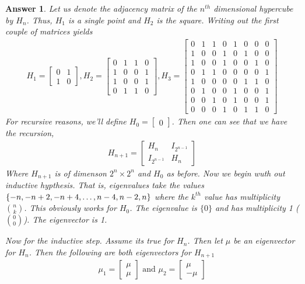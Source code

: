 \documentclass[12pt]{article}
\theoremstyle{colon}
\newtheorem*{answer}{Answer}
\begin{document}
\begin{answer}
  Let us denote the adjacency matrix of the $n^{th}$ dimensional hypercube by $H_n$. Thus, $H_1$ is a single point and $H_2$ is the square. Writing out the first couple of matrices yields
  \begin{gather*}
    H_1 = \begin{bmatrix}
     0 & 1 \\
     1 & 0
    \end{bmatrix}, H_2 = \begin{bmatrix}
     0 & 1 & 1 & 0 \\
     1 & 0 & 0 & 1 \\
     1 & 0 & 0 & 1 \\
     0 & 1 & 1 & 0
    \end{bmatrix}, H_3 = \begin{bmatrix}
     0 & 1 & 1 & 0 & 1 & 0 & 0 & 0 \\
     1 & 0 & 0 & 1 & 0 & 1 & 0 & 0 \\
     1 & 0 & 0 & 1 & 0 & 0 & 1 & 0 \\
     0 & 1 & 1 & 0 & 0 & 0 & 0 & 1 \\
     1 & 0 & 0 & 0 & 0 & 1 & 1 & 0 \\
     0 & 1 & 0 & 0 & 1 & 0 & 0 & 1 \\
     0 & 0 & 1 & 0 & 1 & 0 & 0 & 1 \\
     0 & 0 & 0 & 1 & 0 & 1 & 1 & 0
    \end{bmatrix}
  \end{gather*}
  For recursive reasons, we'll define $H_0 = \begin{bmatrix}0\end{bmatrix}$. Then one can see that we have the recursion,
  \begin{gather*}
    H_{n+1} = \begin{bmatrix}
      H_n & I_{2^{n-1}} \\
      I_{2^{n-1}} & H_n
    \end{bmatrix}
  \end{gather*}
  Where $H_{n+1}$ is of dimenson $2^n \times 2^n$ and $H_0$ as before. Now we begin wuth out inductive hypthesis. That is, eigenvalues take the values $\{-n, -n+2, -n+4, \mathellipsis, n-4, n-2, n\}$ where the $k^{th}$ value has multiplicity $\binom{n}{k}$. This obviously works for $H_0$. The eigenvalue is $\{0\}$ and has multiplicity 1 ($\binom{0}{0}$). The eigenvector is 1.

  Now for the inductive step. Assume its true for $H_n$. Then let $\mu$ be an eigenvector for $H_n$. Then the following are both eigenvectors for $H_{n+1}$
  \begin{gather*}
    \mu_1 = \begin{bmatrix}
      \mu \\
      \mu
    \end{bmatrix} \text{ and } \mu_2 =
    \begin{bmatrix}
      \mu \\
      -\mu
    \end{bmatrix}
  \end{gather*}


\end{answer}
\end{document}
